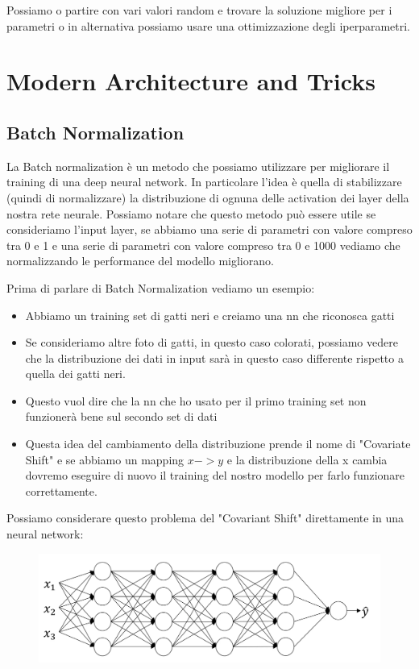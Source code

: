 \documentclass[14pt]{extreport}
\begin{document}
Possiamo o partire con vari valori random e trovare la soluzione migliore per i parametri o in alternativa possiamo usare una ottimizzazione degli
iperparametri.

\section{Modern Architecture and Tricks}

\subsection{Batch Normalization}

La Batch normalization è un metodo che possiamo utilizzare per migliorare il training di una deep neural network. In particolare l'idea è quella di
stabilizzare (quindi di normalizzare) la distribuzione di ognuna delle activation dei layer della nostra rete neurale. Possiamo notare che questo
metodo può essere utile se consideriamo l'input layer, se abbiamo una serie di parametri con valore compreso tra 0 e 1 e una serie di parametri con
valore compreso tra 0 e 1000 vediamo che normalizzando le performance del modello migliorano.

Prima di parlare di Batch Normalization vediamo un esempio:
\begin{itemize}
	\item Abbiamo un training set di gatti neri e creiamo una nn che riconosca gatti
	\item Se consideriamo altre foto di gatti, in questo caso colorati, possiamo vedere che la distribuzione dei dati in input sarà in questo caso
	differente rispetto a quella dei gatti neri.
	\item Questo vuol dire che la nn che ho usato per il primo training set non funzionerà bene sul secondo set di dati
	\item Questa idea del cambiamento della distribuzione prende il nome di "Covariate Shift" e se abbiamo un mapping $x->y$ e la distribuzione della
	      x cambia dovremo eseguire di nuovo il training del nostro modello per farlo funzionare correttamente.
\end{itemize}

Possiamo considerare questo problema del "Covariant Shift" direttamente in una neural network:

\begin{figure}[H]
	\centering
	\includegraphics[width=0.7\linewidth]{429.jpeg}
\end{figure}
\end{document}
